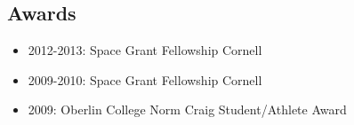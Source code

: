 \documentclass[11pt, oneside]{article}   	%
\begin{document}
%
%

\vspace{-0.15in}
\subsection*{Awards}
\begin{itemize}[noitemsep]
        \item 2012-2013: Space Grant Fellowship Cornell
        \item 2009-2010: Space Grant Fellowship Cornell
        \item 2009: Oberlin College Norm Craig Student/Athlete Award
\end{itemize}
\end{document}
